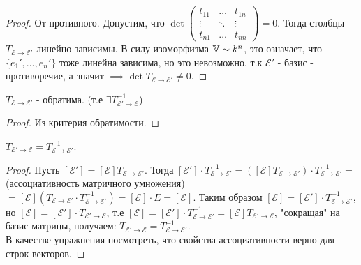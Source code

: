 \documentclass[../main.tex]{subfiles}
\begin{document}
\begin{proof}
    От противного. Допустим, что $\det \begin{pmatrix}
        t_{11} & \dots & t_{1n}\\
        \vdots & \ddots & \vdots\\
        t_{n1} & \dots & t_{nn}
\end{pmatrix} = 0$. Тогда столбцы $T_{\mathcal{E}\to\mathcal{E'}}$ линейно зависимы. В силу изоморфизма $\mathbb{V} \sim k^{n}$, это означает, что $\{e_{1}',\dots,e_{n}'\}$ тоже линейна зависима, но это невозможно, т.к $\mathcal{E'}$ - базис - противоречие, а значит $\implies \det T_{\mathcal{E}\to \mathcal{E'}}\neq 0$.  
\end{proof}
\begin{corollary}
    $T_{\mathcal{E}\to\mathcal{E'}}$ - обратима. (т.е $\exists T^{-1}_{\mathcal{E'}\to\mathcal{E}}$)
\end{corollary}
\begin{proof}
    Из критерия обратимости. 
\end{proof}
\begin{lemma}
    $T_{\mathcal{E'}\to\mathcal{E}}=T^{-1}_{\mathcal{E}\to\mathcal{E'}}$. 
\end{lemma}
\begin{proof}
    Пусть $[\mathcal{E'}] = [\mathcal{E}]T_{\mathcal{E}\to\mathcal{E'}}$. Тогда $[\mathcal{E'}]\cdot T^{-1}_{\mathcal{E}\to\mathcal{E'}} = ([\mathcal{E}]T_{\mathcal{E}\to\mathcal{E'}})\cdot T^{-1}_{\mathcal{E}\to\mathcal{E'}} = $ (ассоциативность матричного умножения) $= [\mathcal{E}](T_{\mathcal{E}\to\mathcal{E'}}\cdot T^{-1}_{\mathcal{E}\to\mathcal{E'}}) = [\mathcal{E}] \cdot E = [\mathcal{E}]$. Таким образом $[\mathcal{E}]= [\mathcal{E'}]\cdot T^{-1}_{\mathcal{E}\to\mathcal{E'}}$, но $[\mathcal{E}]= [\mathcal{E'}]\cdot T_{\mathcal{E'}\to\mathcal{E}}$, т.е $ [\mathcal{E}] = [\mathcal{E'}]\cdot T^{-1}_{\mathcal{E}\to\mathcal{E'}} = [\mathcal{E}] T_{\mathcal{E'}\to\mathcal{E}}$, "сокращая" на базис матрицы, получаем: $T_{\mathcal{E'}\to\mathcal{E}} = T^{-1}_{\mathcal{E}\to\mathcal{E'}}$.
    \\В качестве упражнения посмотреть, что свойства ассоциативности верно для строк векторов.
\end{proof}
\end{document}
